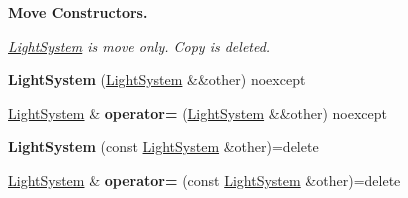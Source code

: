 \begin{Indent}\textbf{ Move Constructors.}\par
{\em \hyperlink{classblaze_1_1LightSystem}{Light\+System} is move only. Copy is deleted. }\begin{DoxyCompactItemize}
\item 
\mbox{\label{classblaze_1_1LightSystem_ab883eecb045f53bc036673bdfba7c9de}} 
{\bfseries Light\+System} (\hyperlink{classblaze_1_1LightSystem}{Light\+System} \&\&other) noexcept
\item 
\mbox{\label{classblaze_1_1LightSystem_a8dde7d8523041fc70c53b6225e001493}} 
\hyperlink{classblaze_1_1LightSystem}{Light\+System} \& {\bfseries operator=} (\hyperlink{classblaze_1_1LightSystem}{Light\+System} \&\&other) noexcept
\item 
\mbox{\label{classblaze_1_1LightSystem_acfd77e3c0bddbbf9dfa9f920749bfbe1}} 
{\bfseries Light\+System} (const \hyperlink{classblaze_1_1LightSystem}{Light\+System} \&other)=delete
\item 
\mbox{\label{classblaze_1_1LightSystem_a8bb752f02d2bcf64375345c25bba1af5}} 
\hyperlink{classblaze_1_1LightSystem}{Light\+System} \& {\bfseries operator=} (const \hyperlink{classblaze_1_1LightSystem}{Light\+System} \&other)=delete
\end{DoxyCompactItemize}
\end{Indent}
